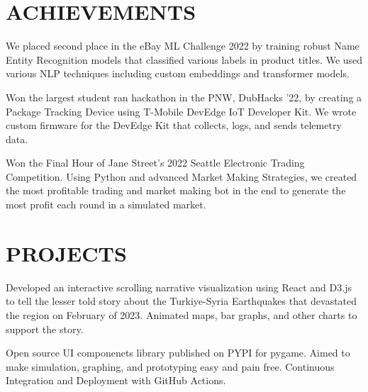 \documentclass[]{main}
\begin{document}
\begin{minipage}[t]{0.66\textwidth}

\section{ACHIEVEMENTS}


We placed second place in the eBay ML Challenge 2022 by training robust Name Entity Recognition models that classified various labels in product titles. We used various NLP techniques including custom embeddings and transformer models.
\sectionsep


Won the largest student ran hackathon in the PNW, DubHacks '22, by creating a Package Tracking Device using T-Mobile DevEdge IoT Developer Kit. We wrote custom firmware for the DevEdge Kit that collects, logs, and sends telemetry data.
\sectionsep


Won the Final Hour of Jane Street's 2022 Seattle Electronic Trading Competition. Using Python and advanced Market Making Strategies, we created the most profitable trading and market making bot in the end to generate the most profit each round in a simulated market.
\sectionsep



\section{PROJECTS}


Developed an interactive scrolling narrative visualization using React and D3.js to tell
the lesser told story about the Turkiye-Syria Earthquakes that devastated the region on 
February of 2023. Animated maps, bar graphs, and other charts to support the story.
\sectionsep

Open source UI componenets library published on PYPI for pygame. Aimed to make simulation, graphing, and prototyping easy and pain free. Continuous Integration and Deployment with GitHub Actions. 
\sectionsep



\end{minipage}
\end{document}
